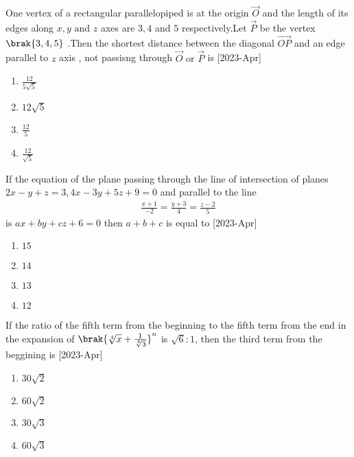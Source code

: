     \item One vertex of a rectangular parallelopiped is at the origin $\vec{O}$ and the length of its edges along $ x , y \text{ and } z $ axes are $ 3 , 4 $ and $ 5 $ respectively.Let $\vec{P}$ be the vertex $\brak{ 3 , 4 , 5 }$ .Then the shortest distance between the diagonal $\vec{OP}$ and an edge parallel to $z$ axis , not passisng through $ \vec{O} \text{ or } \vec{P}$ is \hfill[2023-Apr]
    \begin{multicols}{2}
        \begin{enumerate}
            \item $\frac{12}{5\sqrt{5}}$\\
            \item $12 \sqrt{5}$
            \item $\frac{12}{5}$\\
            \item $\frac{12}{\sqrt{5}}$
        \end{enumerate}
    \end{multicols}
    \item If the equation of the plane passing through the line of intersection of planes $2x - y + z = 3 , 4x -3y +5z+9 =0$ and parallel to the line 
    \begin{align}
        \frac{x+1}{-2} = \frac{y+3}{4} = \frac{z-2}{5}
    \end{align}
    is $ax+ by + cz + 6 = 0 $ then $a + b + c$ is equal to \hfill[2023-Apr]
    \begin{multicols}{2}
    \begin{enumerate}
        \item $15$
        \item $14$\\
        \item $13$
        \item $12$
    \end{enumerate}
    \end{multicols}
     \item If the ratio of the fifth term from the beginning to the fifth term from the end in the expansion of $\brak{\sqrt[4]{x} + \frac{1}{\sqrt[4]{3}}}^n$ is $\sqrt{6} \colon 1$, then the third term from the beggining is \hfill[2023-Apr]
    \begin{multicols}{2}
        \begin{enumerate}
            \item $30 \sqrt{2}$
            \item $60 \sqrt{2}$\\
            \item $30 \sqrt{3}$
            \item $60 \sqrt{3}$
        \end{enumerate}
    \end{multicols}
